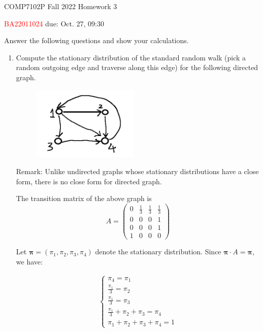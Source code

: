 



\noindent
\hspace*{.2in} COMP7102P Fall 2022
\hfill Homework 3\\
\begin{CJK}{UTF8}{gbsn}
    \hspace*{.2in} \textcolor{red}{BA22011024 \Name{} \ChineseName} \hfill due: Oct. 27, 09:30
\end{CJK}
\bigskip


\begin{problem}[30 points] Answer the following questions and show your calculations.
\begin{enumerate}
  \item Compute the stationary distribution of the standard random walk (pick a random outgoing edge and traverse along this edge) for the following directed graph.
  \begin{figure}[H]
    \centering
    \includegraphics[width=2in]{images/123.png}
  \end{figure}     
  Remark: Unlike undirected graphs whose stationary distributions have a close form, there is no close form for directed graph.
   
  \Answer
  The transition matrix of the above graph is 
  \begin{equation}
  A = { \left( \begin{array}{cccc}
    0 & \frac{1}{3} & \frac{1}{3} & \frac{1}{3}\\
    0 & 0 & 0 & 1\\
    0 & 0 & 0 & 1 \\
    1 & 0 & 0 & 0 \end{array} \right)}
  \end{equation}
 
  Let $\mathbf{\pi} = (\pi_1, \pi_2, \pi_3, \pi_4)$ denote the stationary distribution. Since $\mathbf{\pi} \cdot A = \mathbf{\pi}$, we have:

  \begin{align}\label{eq:1}
  \begin{cases}
  \pi_4 = \pi_1\\
  \frac{\pi_1}{3} = \pi_2\\
    \frac{\pi_1}{3} = \pi_3\\
    \frac{\pi_1}{3}+\pi_2+\pi_3 = \pi_4\\
    \pi_1+ \pi_2+ \pi_3+ \pi_4 =1
  \end{cases}
  \end{align}
 

\end{enumerate}
\end{problem}
